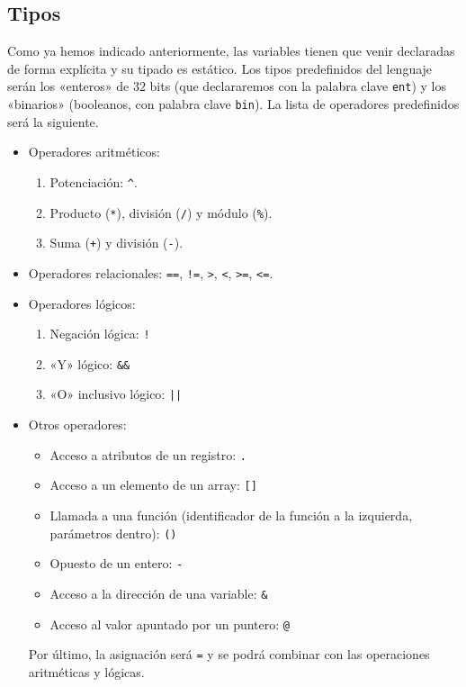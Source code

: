 \subsection*{Tipos}
Como ya hemos indicado anteriormente, las variables tienen que venir declaradas
de forma explícita y su tipado es estático. Los tipos predefinidos del lenguaje
serán los «enteros» de $32$ bits (que declararemos con la palabra clave
\lstinline{ent}) y los «binarios» (booleanos, con palabra clave
\lstinline{bin}). La lista de operadores predefinidos será la siguiente.
\begin{itemize}
\item Operadores aritméticos:
    \begin{enumerate}
        \item Potenciación: \lstinline{^}.
        \item Producto (\lstinline{*}), división (\lstinline{/}) y módulo (\lstinline{%}).
        \item Suma (\lstinline{+}) y división (\lstinline{-}).
    \end{enumerate}
\item Operadores relacionales: \lstinline{==}, \lstinline{!=}, \lstinline{>}, \lstinline{<},
    \lstinline{>=}, \lstinline{<=}.

\item Operadores lógicos:
\begin{enumerate}
    \item Negación lógica: \lstinline{!}
    \item «Y» lógico: \lstinline{&&}
    \item «O» inclusivo lógico: \lstinline{||}
\end{enumerate}

\item Otros operadores:
\begin{itemize}
    \item Acceso a atributos de un registro: \lstinline{.}
    \item Acceso a un elemento de un array: \lstinline{[]}
    \item Llamada a una función (identificador de la función a la izquierda,
        parámetros dentro): \lstinline{()}
    \item Opuesto de un entero: \lstinline{-}
    \item Acceso a la dirección de una variable: \lstinline{&}
    \item Acceso al valor apuntado por un puntero: \lstinline{@}
\end{itemize}
Por último, la asignación será \lstinline{=} y se podrá combinar con las
operaciones aritméticas y lógicas.
\end{itemize}
